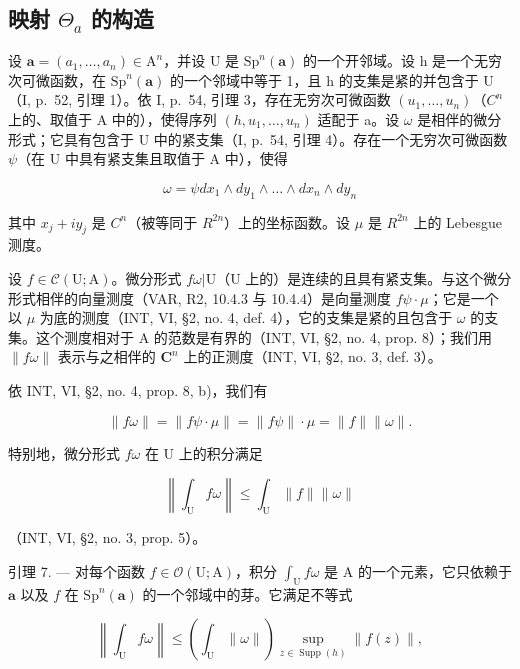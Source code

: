 \subsection{\texorpdfstring{映射 \(\Theta_{a}\) 的构造}{映射 \textbackslash Theta\_\{a\} 的构造}}

设 \(\boldsymbol{a}=(a_{1},\ldots,a_{n})\in\mathrm{A}^{n}\)，并设 U 是 \(\mathrm{Sp}^{n}(\boldsymbol{a})\) 的一个开邻域。设 h 是一个无穷次可微函数，在 \(\mathrm{Sp}^{n}(\boldsymbol{a})\) 的一个邻域中等于 1，且 h 的支集是紧的并包含于 U（I, p.~52, 引理 1）。依 I, p.~54, 引理 3，存在无穷次可微函数 \((u_{1},\ldots,u_{n})\)（\(C^{n}\) 上的、取值于 A 中的），使得序列 \((h,u_{1},\ldots,u_{n})\) 适配于 a。设 \(\omega\) 是相伴的微分形式；它具有包含于 U 中的紧支集（I, p.~54, 引理 4）。存在一个无穷次可微函数 \(\psi\)（在 U 中具有紧支集且取值于 A 中），使得

\[
\omega = \psi d x _ {1} \wedge d y _ {1} \wedge \dots \wedge d x _ {n} \wedge d y _ {n}
\]

其中 \(x_{j} + iy_{j}\) 是 \(C^{n}\)（被等同于 \(R^{2n}\)）上的坐标函数。设 \(\mu\) 是 \(R^{2n}\) 上的 Lebesgue 测度。

设 \(f \in \mathcal{C}(\mathrm{U};\mathrm{A})\)。微分形式 \(f\omega|\mathrm{U}\)（\(\mathrm{U}\) 上的）是连续的且具有紧支集。与这个微分形式相伴的向量测度（VAR, R2, 10.4.3 与 10.4.4）是向量测度 \(f\psi \cdot \mu\)；它是一个以 \(\mu\) 为底的测度（INT, VI, §2, no. 4, def. 4），它的支集是紧的且包含于 \(\omega\) 的支集。这个测度相对于 A 的范数是有界的（INT, VI, §2, no. 4, prop. 8）；我们用 \(\| f\omega\|\) 表示与之相伴的 \(\mathbf{C}^n\) 上的正测度（INT, VI, §2, no. 3, def. 3）。

依 INT, VI, §2, no. 4, prop. 8, b)，我们有

\[
\| f \omega \| = \| f \psi \cdot \mu \| = \| f \psi \| \cdot \mu = \| f \| \| \omega \|.
\]

特别地，微分形式 \(f\omega\) 在 U 上的积分满足

\[
\left\| \int_ {\mathrm{U}} f \omega \right\| \leqslant \int_ {\mathrm{U}} \| f \| \| \omega \|
\]

（INT, VI, §2, no. 3, prop. 5）。

引理 7. --- 对每个函数 \(f \in \mathcal{O}(\mathrm{U};\mathrm{A})\)，积分 \(\int_{\mathrm{U}} f\omega\) 是 A 的一个元素，它只依赖于 \(\boldsymbol{a}\) 以及 \(f\) 在 \(\mathrm{Sp}^{n}(\boldsymbol{a})\) 的一个邻域中的芽。它满足不等式

\[
\left\| \int_ {\mathrm{U}} f \omega \right\| \leqslant \left(\int_ {\mathrm{U}} \| \omega \|\right) \sup _ {z \in \operatorname{Supp} (h)} \| f (z) \|,\tag{4}
\]

